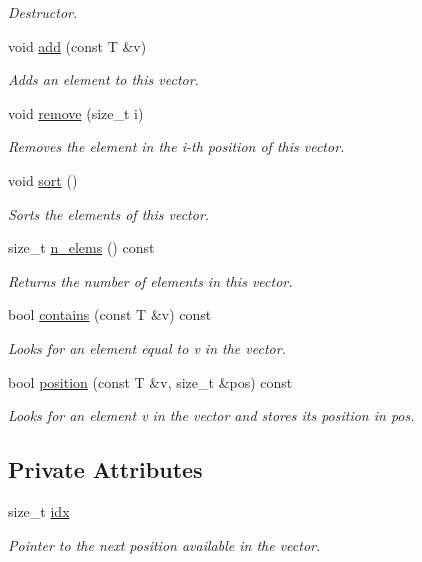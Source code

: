 \begin{DoxyCompactItemize}
\begin{DoxyCompactList}\small\item\em Destructor. \end{DoxyCompactList}\item 
void \hyperlink{classlgraph_1_1utils_1_1svector_a14ffd05a33eeae26ddb0909d8f64ad28}{add} (const T \&v)
\begin{DoxyCompactList}\small\item\em Adds an element to this vector. \end{DoxyCompactList}\item 
void \hyperlink{classlgraph_1_1utils_1_1svector_a9d377cbaa26f09a862334363e2d889cc}{remove} (size\+\_\+t i)
\begin{DoxyCompactList}\small\item\em Removes the element in the i-\/th position of this vector. \end{DoxyCompactList}\item 
void \hyperlink{classlgraph_1_1utils_1_1svector_ac2199e164429f7469decfa9d8f033069}{sort} ()
\begin{DoxyCompactList}\small\item\em Sorts the elements of this vector. \end{DoxyCompactList}\item 
size\+\_\+t \hyperlink{classlgraph_1_1utils_1_1svector_a36428d7450874d526ced6f1e8e0fe353}{n\+\_\+elems} () const 
\begin{DoxyCompactList}\small\item\em Returns the number of elements in this vector. \end{DoxyCompactList}\item 
bool \hyperlink{classlgraph_1_1utils_1_1svector_ab17c14abafd02d01a0e1f8230ed23680}{contains} (const T \&v) const 
\begin{DoxyCompactList}\small\item\em Looks for an element equal to {\itshape v} in the vector. \end{DoxyCompactList}\item 
bool \hyperlink{classlgraph_1_1utils_1_1svector_aed55a2e91d3ba407b5268ba339dddd81}{position} (const T \&v, size\+\_\+t \&pos) const 
\begin{DoxyCompactList}\small\item\em Looks for an element {\itshape v} in the vector and stores its position in {\itshape pos}. \end{DoxyCompactList}\end{DoxyCompactItemize}
\subsection*{Private Attributes}
\begin{DoxyCompactItemize}
\item 
size\+\_\+t \hyperlink{classlgraph_1_1utils_1_1svector_a7ef963c079c7dc8a6a559ceef81a241f}{idx}
\begin{DoxyCompactList}\small\item\em Pointer to the next position available in the vector. \end{DoxyCompactList}\end{DoxyCompactItemize}
